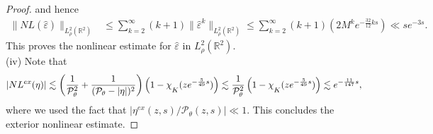 \documentclass[10pt,a4paper]{amsart}
\newcommand{\mchi}{\raisebox{0pt}[1ex][1ex]{$\chi$}}
\newcommand{\veph}{\hat\varepsilon }
\begin{document}
\begin{proof}
    and hence
    \begin{align*}
        \|NL(\veph)\|_{L^2_{\rho}(\mathbb{R}^2)} &\leq \sum_{k=2}^{\infty}(k+1) \|\veph^k\|_{L^2_{\rho}(\mathbb{R}^2)} \leq\sum_{k=2}^{\infty}(k+1)(2M^ke^{-\frac{32}{12}ks})\ll se^{-3s}.
    \end{align*}
    This proves the nonlinear estimate for \(\veph\) in \(L^2_{\rho}(\mathbb{R}^2)\).\\
   (iv) Note that 
    \begin{align*}
        |NL^{ex}(\eta)| \lesssim\left( \frac{1}{\mathcal{P}_{\theta}^2}+\frac{1}{(\mathcal{P}_{\theta}-|\eta|)^2}\right)\left(1-\mchi_{K}(ze^{-\frac{5}{49}s})\right)\lesssim \frac{1}{\mathcal{P}_{\theta}^2}\left(1-\mchi_{K}(ze^{-\frac{5}{49}s})\right) \lesssim e^{-\frac{11}{147}s},
    \end{align*}
    where we used the fact that \(|\eta^{ex}(z,s)/\mathcal{P}_{\theta}(z,s)| \ll 1\). This concludes the exterior nonlinear estimate.
\end{proof}
\end{document}
